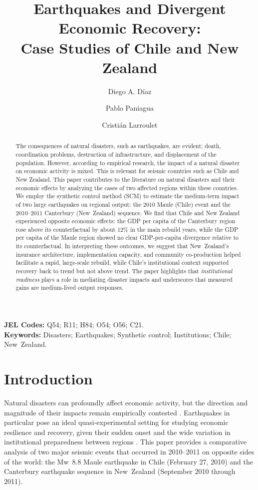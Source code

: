 \documentclass[12pt]{article}
\title{\Large\textbf{Earthquakes and Divergent Economic Recovery:\\
Case Studies of Chile and New Zealand}}
\author[1]{Diego A. Díaz}
\author[2]{Pablo Paniagua}
\author[1]{Cristián Larroulet}
\affil[1]{School of Business and Economics (FEN), Universidad del Desarrollo}
\affil[2]{Department of Political Economy, King's College London}
\begin{document}
\maketitle

\begin{abstract}
\singlespacing
The consequences of natural disasters, such as earthquakes, are evident: death, coordination problems, destruction of infrastructure, and displacement of the population. However, according to empirical research, the impact of a natural disaster on economic activity is mixed. This is relevant for seismic countries such as Chile and New Zealand. This paper contributes to the literature on natural disasters and their economic effects by analyzing the cases of two affected regions within these countries. We employ the synthetic control method (SCM) to estimate the medium-term impact of two large earthquakes on regional output: the 2010 Maule (Chile) event and the 2010--2011 Canterbury (New~Zealand) sequence. We find that Chile and New Zealand experienced opposite economic effects: the GDP per capita of the Canterbury region rose above its counterfactual by about 12\% in the main rebuild years, while the GDP per capita of the Maule region showed no clear GDP-per-capita divergence relative to its counterfactual. In interpreting these outcomes, we suggest that New~Zealand’s insurance architecture, implementation capacity, and community co-production helped facilitate a rapid, large-scale rebuild, while Chile’s institutional context supported recovery back to trend but not above trend. The paper highlights that \textit{institutional readiness} plays a role in mediating disaster impacts and underscores that measured gains are medium-lived output responses.
\end{abstract}



\noindent\textbf{JEL Codes:} Q54; R11; H84; O54; O56; C21.\\
\noindent\textbf{Keywords:} Disasters; Earthquakes; Synthetic control; Institutions; Chile; New Zealand.\\

\newpage
\section{Introduction}
Natural disasters can profoundly affect economic activity, but the direction and magnitude of their impacts remain empirically contested \parencite{noy2009macroeconomic, barone2014natural, boustan2020effect, coffman2012hurricane}. Earthquakes in particular pose an ideal quasi-experimental setting for studying economic resilience and recovery, given their sudden onset and the wide variation in institutional preparedness between regions \parencite{barone2014natural, boustan2020effect, kahn2005death}. This paper provides a comparative analysis of two major seismic events that occurred in 2010--2011 on opposite sides of the world: the Mw 8.8 Maule earthquake in Chile (February 27, 2010) and the Canterbury earthquake sequence in New Zealand (September 2010 through 2011).
\end{document}
